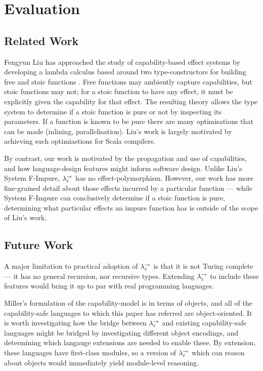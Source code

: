
\chapter{Evaluation}

\section{Related Work}

Fengyun Liu has approached the study of capability-based effect systems by developing a lambda calculus based around two type-constructors for building free and stoic functions \cite{liu16}. Free functions may ambiently capture capabilities, but stoic functions may not; for a stoic function to have any effect, it must be explicitly given the capability for that effect. The resulting theory allows the type system to determine if a stoic function is pure or not by inspecting its parameters. If a function is known to be pure there are many optimisations that can be made (inlining, parallelisation). Liu's work is largely motivated by achieving such optimiastions for Scala compilers.

By contrast, our work is motivated by the propagation and use of capabilities, and how language-design features might inform software design. Unlike Liu's System F-Impure, $\lambda^{\rightarrow}_{\varepsilon}$ has no effect-polymorphism. However, our work has more fine-grained detail about those effects incurred by a particular function --- while System F-Impure can conclusively determine if a stoic function is pure, determining what particular effects an impure function has is outside of the scope of Liu's work.

\section{Future Work}

A major limitation to practical adoption of $\lambda^{\rightarrow}_{\varepsilon}$ is that it is not Turing complete --- it has no general recursion, nor recursive types. Extending $\lambda^{\rightarrow}_{\varepsilon}$ to include these features would bring it up to par with real programming languages.

Miller's formulation of the capability-model is in terms of objects, and all of the capability-safe languages to which this paper has referred are object-oriented. It is worth investigating how the bridge between $\lambda^{\rightarrow}_{\varepsilon}$ and existing capability-safe languages might be bridged by investigating different object encodings, and determining which langauge extensions are needed to enable these. By extension, these languages have first-class modules, so a version of $\lambda^{\rightarrow}_{\varepsilon}$ which can reason about objects would immediately yield module-level reasoning.

